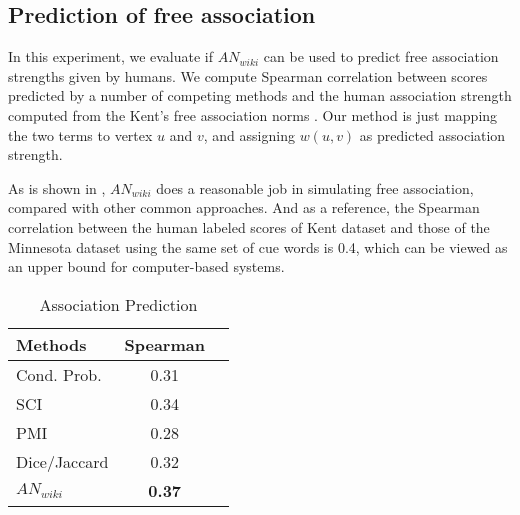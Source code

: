 \subsection{Prediction of free association}
\label{sec:predict}

In this experiment, we evaluate if $AN_{wiki}$ can be used to
predict free association strengths given by humans. We compute
Spearman correlation between scores predicted by a number of
competing methods \cite{asso09} and the human association strength
computed from the Kent's free association norms .
Our method is just mapping the two terms to vertex $u$ and $v$, and
assigning $w(u,v)$ as predicted association strength. 


As is shown in ,
$AN_{wiki}$ does a reasonable job in simulating free association,
compared with other common approaches. And as a reference, the
Spearman correlation between the human labeled scores of Kent dataset and those of the Minnesota
dataset \cite{Minnesota} using the same set of cue words is 0.4,
which can be viewed as an upper bound for computer-based systems.
\begin{table}[ht]
\centering
\caption{Association Prediction}
\begin{tabular}{lcc}
\hline
Methods & Spearman  \\
\hline
Cond. Prob. & 0.31 \\
SCI & 0.34 \\
PMI & 0.28 \\
Dice/Jaccard & 0.32 \\
$AN_{wiki}$ & {\bf0.37} \\
\hline
\end{tabular}
\label{tab:predict}
\end{table}


